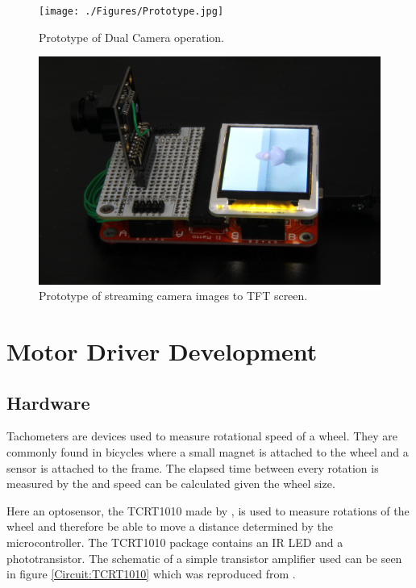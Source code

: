 \begin{figure}
\texttt{[image: ./Figures/Prototype.jpg]}
\caption{Prototype of Dual Camera operation.}
\label{fig:Prototype}
\end{figure}

\begin{figure}
\includegraphics[width=\textwidth]{./Figures/Camera_TFT.jpg}
\caption{Prototype of streaming camera images to TFT screen.}
\label{fig:Prototype:TFT}
\end{figure}

\section{Motor Driver Development}\label{Section:Motor_Dev}

\subsection{Hardware}
Tachometers are devices used to measure rotational speed of a wheel. They are commonly found in bicycles where a small magnet is attached to the wheel and a sensor is attached to the frame. The elapsed time between every rotation is measured by the and speed can be calculated given the wheel size. 

Here an optosensor, the TCRT1010 made by \cite{Vishay:TCRT1010:Datasheet}, is used to measure rotations of the wheel and therefore be able to move a distance determined by the microcontroller. The TCRT1010 package contains an IR LED and a phototransistor. The schematic of a simple transistor amplifier used can be seen in figure \ref{Circuit:TCRT1010} which was reproduced from \cite{c9Lab:SRG}. 

